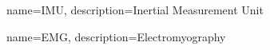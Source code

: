 
{
        name=IMU,
        description={Inertial Measurement Unit}
} 
 
 
{
        name=EMG,
        description={Electromyography}
}

